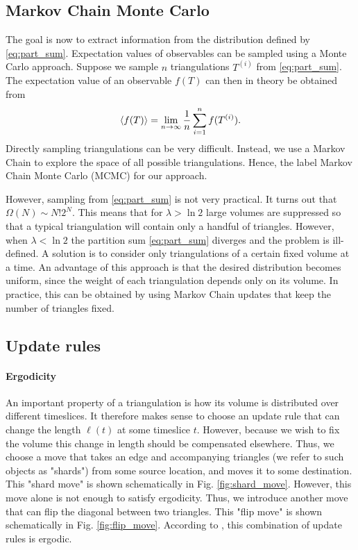 
\subsection{Markov Chain Monte Carlo}

The goal is now to extract information from the distribution defined by \eqref{eq:part_sum}. Expectation values of observables can be sampled using a Monte Carlo approach. Suppose we sample $n$ triangulations $T^{(i)}$ from \eqref{eq:part_sum}. The expectation value of an observable $f(T)$ can then in theory be obtained from
\begin{equation}
    \ev{f(T)}
    =
    \lim_{n \to \infty} \frac{1}{n} \sum_{i = 1}^n f(T^{(i)})
    .
\end{equation}
Directly sampling triangulations can be very difficult. Instead, we use a Markov Chain to explore the space of all possible triangulations. Hence, the label Markov Chain Monte Carlo (MCMC) for our approach.

However, sampling from \eqref{eq:part_sum} is not very practical. It turns out that $\Omega(N) \sim N! 2^N$. This means that for $\lambda > \ln 2$ large volumes are suppressed so that a typical triangulation will contain only a handful of triangles.
However, when $\lambda < \ln 2$ the partition sum \eqref{eq:part_sum} diverges and the problem is ill-defined.
A solution is to consider only triangulations of a certain fixed volume at a time.
An advantage of this approach is that the desired distribution becomes uniform, since the weight of each triangulation depends only on its volume.
In practice, this can be obtained by using Markov Chain updates that keep the number of triangles fixed.

\subsection{Update rules}
\paragraph{Ergodicity}
An important property of a triangulation is how its volume is distributed over different timeslices. It therefore makes sense to choose an update rule that can change the length $\ell(t)$ at some timeslice $t$. However, because we wish to fix the volume this change in length should be compensated elsewhere. Thus, we choose a move that takes an edge and accompanying triangles (we refer to such objects as "shards") from some source location, and moves it to some destination. This "shard move" is shown schematically in Fig. \ref{fig:shard_move}. However, this move alone is not enough to satisfy ergodicity. Thus, we introduce another move that can flip the diagonal between two triangles. This "flip move" is shown schematically in Fig. \ref{fig:flip_move}. According to \cite{2012}, this combination of update rules is ergodic.

